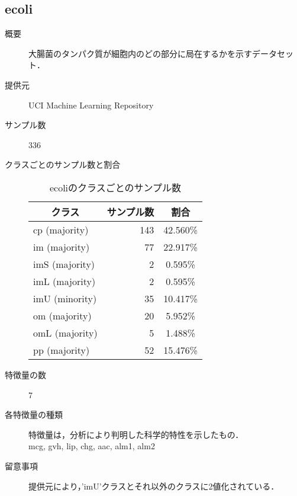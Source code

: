 \subsection{ecoli}
\begin{description}
    \item[概要] 大腸菌のタンパク質が細胞内のどの部分に局在するかを示すデータセット． \cite{ecoli}
    \item[提供元] UCI Machine Learning Repository
    \item[サンプル数] 336
    \item[クラスごとのサンプル数と割合] \mbox{}
        \begin{table}[htbp]
            \centering
            \caption{ecoliのクラスごとのサンプル数}
            \label{tab:ecoli}
            \begin{tabular}{lrc} \hline
                \multicolumn{1}{c}{クラス}&
                \multicolumn{1}{c}{サンプル数}&
                \multicolumn{1}{c}{割合}\\
                \hline
                \hline
                cp (majority)& 143 & 42.560\% \\
                im (majority)& 77 & 22.917\% \\
                imS (majority)& 2 & 0.595\% \\
                imL (majority)& 2 & 0.595\% \\
                imU (minority)& 35 & 10.417\% \\
                om (majority)& 20 & 5.952\% \\
                omL (majority)& 5 & 1.488\% \\
                pp (majority)& 52 & 15.476\% \\
                \hline
            \end{tabular}
        \end{table}
    \item[特徴量の数] 7
    \item[各特徴量の種類] 特徴量は，分析により判明した科学的特性を示したもの．\\
            mcg, gvh, lip, chg, aac, alm1, alm2
    \item[留意事項] 提供元により，'imU'クラスとそれ以外のクラスに2値化されている．
\end{description}

